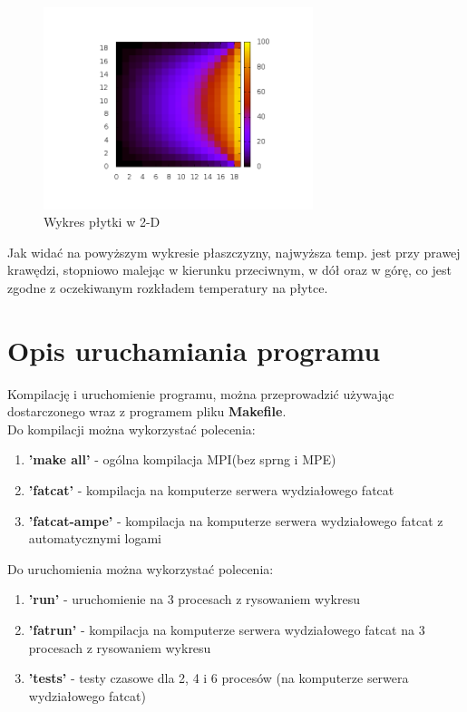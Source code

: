 \documentclass[11pt,a4paper]{article}
\begin{document}
\begin{figure}[H]
\begin{center}
\includegraphics[width=0.7\textwidth]{grid.png}
\caption{Wykres płytki w 2-D}
\end{center}
\end{figure}

Jak widać na powyższym wykresie płaszczyzny, najwyższa temp. jest przy prawej krawędzi, stopniowo malejąc w kierunku przeciwnym, w dół oraz w górę, co jest zgodne z oczekiwanym rozkładem temperatury na płytce.

\section{Opis uruchamiania programu}

Kompilację i uruchomienie programu, można przeprowadzić używając dostarczonego wraz z programem pliku \textbf{Makefile}.\\
Do kompilacji można wykorzystać polecenia:
\begin{enumerate}
	\item \textbf{'make all'} - ogólna kompilacja  MPI(bez sprng i MPE)
	\item \textbf{'fatcat'} - kompilacja na komputerze serwera wydziałowego fatcat
	\item \textbf{'fatcat-ampe'} - kompilacja na komputerze serwera wydziałowego fatcat z automatycznymi logami
\end{enumerate}
Do uruchomienia można wykorzystać polecenia:
\begin{enumerate}
	\item \textbf{'run'} - uruchomienie na 3 procesach z rysowaniem wykresu
	\item \textbf{'fatrun'} - kompilacja na komputerze serwera wydziałowego fatcat na 3 procesach z rysowaniem wykresu
	\item \textbf{'tests'} - testy czasowe dla 2, 4 i 6 procesów (na komputerze serwera wydziałowego fatcat)
\end{enumerate}
\end{document}

